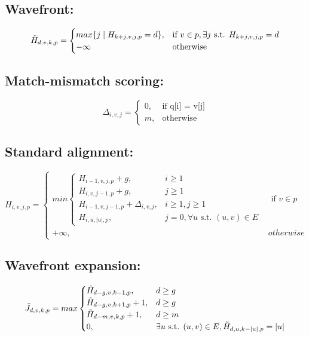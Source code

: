 \documentclass{article}
\begin{document}
\subsection{Wavefront:}
\begin{equation}
    \Tilde{H}_{d,v,k,p} = \begin{cases}
        max\{j \mid H_{k+j,v,j,p} = d\}, & \text{if } v \in p, \exists j \text{ s.t. } H_{k+j,v,j,p} = d \\
        -\infty & \text{otherwise}
    \end{cases}
\end{equation}


\subsection{Match-mismatch scoring:}
\begin{equation}
    \Delta_{i,v,j} = \begin{cases}
        0, & \text{if $$q[i] = v[j]$$} \\
        m, & \text{otherwise}
    \end{cases}
\end{equation}

\subsection{Standard alignment:}
\begin{equation}
    H_{i,v,j,p} = \begin{cases} 
        min \begin{cases}
            H_{i-1,v,j,p} + g, & i \ge 1 \\
            H_{i,v,j-1,p} + g, & j \ge 1 \\
            H_{i-1,v,j-1,p} + \Delta_{i,v,j}, & i\ge1, j\ge1 \\
            H_{i,u,\lvert{u}\rvert,p}, & j=0, \forall u \text{ s.t. } (u, v) \in E
        \end{cases} & \text{ if } v \in p \\
        +\infty, & otherwise
    \end{cases}
\end{equation}

\subsection{Wavefront expansion:}
\begin{equation}
\Tilde{J}_{d,v,k,p} = max \begin{cases}
    \Tilde{H}_{d-g,v,k-1,p}, & d \ge g\\
    \Tilde{H}_{d-g,v,k+1,p} + 1, & d \ge g\\
    \Tilde{H}_{d-m,v,k,p} + 1, & d \ge m\\
    0, & \exists u \text{ s.t. } (u, v) \in E, \Tilde{H}_{d,u,k - \lvert u \rvert, p} = \lvert u\rvert
\end{cases}
\end{equation}
\end{document}
